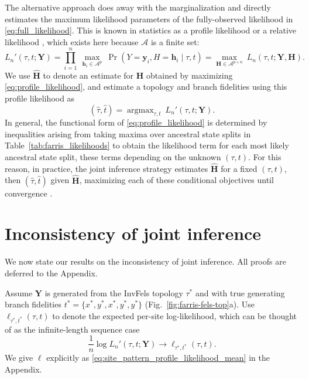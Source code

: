 \documentclass[11pt]{article}
\newcommand{\alphabet}{\mathcal{A}}
\newcommand{\fullAlignment}{\mathbf{Y}}
\newcommand{\alignmentColumn}{\mathbf{y}}
\newcommand{\alignmentColumnRV}{Y}
\newcommand{\fullAncestralStates}{\mathbf{H}}
\newcommand{\ancestralStateColumn}{\mathbf{h}}
\newcommand{\ancestralStateColumnRV}{H}
\newcommand{\nCols}{n}
\newcommand{\nAncestralStateRows}{p}
\DeclareMathOperator*{\argmax}{argmax}
\begin{document}
The alternative approach \citep{Sagulenko2018-xl} does away with the marginalization and directly estimates the maximum likelihood parameters of the fully-observed likelihood in \eqref{eq:full_likelihood}.
This is known in statistics as a profile likelihood \citep{Murphy2000-ry} or a relative likelihood \citep{Goldman1990-dk}, which exists here because $\alphabet$ is a finite set:
\begin{equation}
\label{eq:profile_likelihood}
L_\nCols'(\tau, t; \fullAlignment) = \prod_{i=1}^{\nCols} \ \max_{\ancestralStateColumn_i\in\alphabet^{\nAncestralStateRows}} \ \Pr(\alignmentColumnRV=\alignmentColumn_i, \ancestralStateColumnRV=\ancestralStateColumn_i \mid \tau, t) = \max_{\fullAncestralStates\in\alphabet^{\nAncestralStateRows\times\nCols}} \ L_\nCols(\tau, t; \fullAlignment, \fullAncestralStates).
\end{equation}
We use $\hat{\fullAncestralStates}$ to denote an estimate for $\fullAncestralStates$ obtained by maximizing \eqref{eq:profile_likelihood}, and estimate a topology and branch fidelities using this profile likelihood as
\begin{equation}
\label{eq:profile_likelihood_topology_bl}
(\hat{\tau}, \hat{t}) = \argmax_{\tau, t} \ L_\nCols'(\tau, t; \fullAlignment).
\end{equation}
In general, the functional form of \eqref{eq:profile_likelihood} is determined by inequalities arising from taking maxima over ancestral state splits in Table~\ref{tab:farris_likelihoods} to obtain the likelihood term for each most likely ancestral state split, these terms depending on the unknown $(\tau, t)$.
For this reason, in practice, the joint inference strategy estimates $\hat{\fullAncestralStates}$ for a fixed $(\tau,t)$, then $(\hat{\tau},\hat{t})$ given $\hat{\fullAncestralStates}$, maximizing each of these conditional objectives until convergence \citep{Sagulenko2018-xl}.


\section*{Inconsistency of joint inference}

We now state our results on the inconsistency of joint inference.
All proofs are deferred to the Appendix.

Assume $\fullAlignment$ is generated from the InvFels topology $\tau^*$ and with true generating branch fidelities $t^*=\{x^*, y^*, x^*, y^*, y^*\}$ (Fig.~\ref{fig:farris-fels-top}a).
Use $\ell_{\tau^*,t^*}(\tau, t)$ to denote the expected per-site log-likelihood, which can be thought of as the infinite-length sequence case
\[
\frac{1}{n}\log L_\nCols'(\tau, t; \fullAlignment) \rightarrow \ell_{\tau^*,t^*}(\tau, t).
\]
We give $\ell$ explicitly as \eqref{eq:site_pattern_profile_likelihood_mean} in the Appendix.
\end{document}
